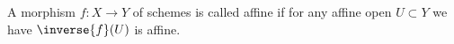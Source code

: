 \begin{definition}
A morphism $f:X\rightarrow Y$ of schemes is called affine if for any affine open $U\subset Y$ we have $\inverse{f}(U)$ is affine.
\end{definition}